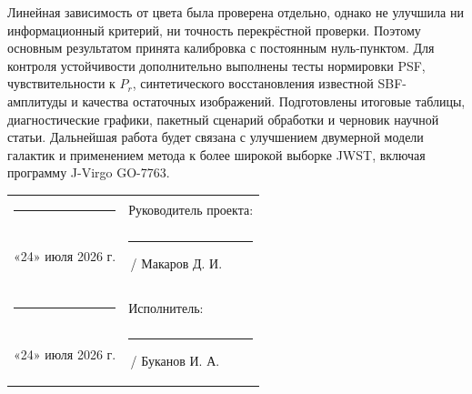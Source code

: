 \documentclass[11pt,letterpaper]{article}
\newcommand{\StudentShortName}{Буканов И. А.}
\newcommand{\ReportDate}{«24» июля 2026 г.}
\newcommand{\SupervisorFullName}{Макаров Д. И.}
\begin{document}
Линейная зависимость от цвета была проверена отдельно, однако не улучшила ни
информационный критерий, ни точность перекрёстной проверки. Поэтому основным
результатом принята калибровка с постоянным нуль-пунктом. Для контроля
устойчивости дополнительно выполнены тесты нормировки PSF, чувствительности к
$P_r$, синтетического восстановления известной SBF-амплитуды и качества
остаточных изображений. Подготовлены итоговые таблицы, диагностические графики,
пакетный сценарий обработки и черновик научной статьи. Дальнейшая работа будет
связана с улучшением двумерной модели галактик и применением метода к более
широкой выборке JWST, включая программу J-Virgo GO-7763.

\vfill

\noindent
\begin{tabularx}{\textwidth}{@{}X X@{}}
  \rule{38mm}{0.4pt} & Руководитель проекта: \\
  \ReportDate & \rule{38mm}{0.4pt}\,/ \SupervisorFullName \\
  \\[3mm]
  \rule{38mm}{0.4pt} & Исполнитель: \\
  \ReportDate & \rule{38mm}{0.4pt}\,/ \StudentShortName
\end{tabularx}
\end{document}
